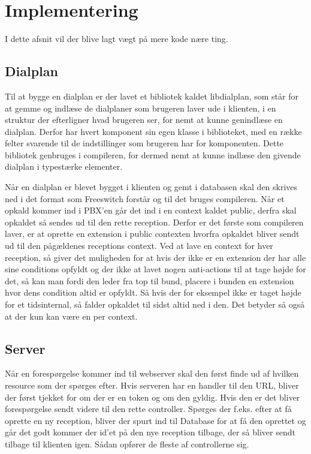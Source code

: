 \chapter{Implementering}

I dette afsnit vil der blive lagt vægt på mere kode nære ting.

\section{Dialplan}

Til at bygge en dialplan er der lavet et bibliotek kaldet libdialplan, som står for at gemme og indlæse de dialplaner som brugeren laver ude i klienten, i en struktur der efterligner hvad brugeren ser, for nemt at kunne genindlæse en dialplan. Derfor har hvert komponent sin egen klasse i biblioteket, med en række felter svarende til de indstillinger som brugeren har for komponenten. Dette bibliotek genbruges i compileren, for dermed nemt at kunne indlæse den givende dialplan i typestærke elementer.


Når en dialplan er blevet bygget i klienten og gemt i databasen skal den skrives ned i det format som Freeswitch forstår og til det bruges compileren. Når et opkald kommer ind i PBX'en går det ind i en context kaldet public, derfra skal opkaldet så sendes ud til den rette reception. Derfor er det første som compileren laver, er at oprette en extension i public contexten hvorfra opkaldet bliver sendt ud til den pågældenes receptions context.
Ved at lave en context for hver reception, så giver det muligheden for at hvis der ikke er en extension der har alle sine conditions opfyldt og der ikke at lavet nogen anti-actions til at tage højde for det, så kan man fordi den leder fra top til bund, placere i bunden en extension hvor dens condition altid er opfyldt. Så hvis der for eksempel ikke er taget højde for et tidsinternal, så falder opkaldet til sidst altid ned i den. Det betyder så også at der kun kan være en per context.

\section{Server}

Når en forespørgelse kommer ind til webserver skal den først finde ud af hvilken resource som der spørges efter. Hvis serveren har en handler til den URL, bliver der først tjekket for om der er en token og om den gyldig. Hvis den er det bliver forespørgelse sendt videre til den rette controller. Spørges der f.eks. efter at få oprette en ny reception, bliver der spurt ind til Database for at få den oprettet og går det godt kommer der id'et på den nye reception tilbage, der så bliver sendt tilbage til klienten igen. 
Sådan opfører de fleste af controllerne sig.


